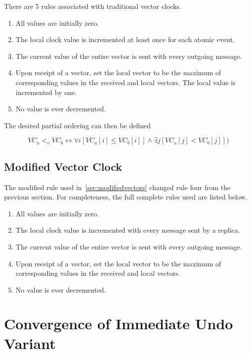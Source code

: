 \documentclass[12pt,a4paper,twoside,openright]{report}
\begin{document}
There are 5 rules associated with traditional vector clocks.
\begin{enumerate}
	\item All values are initially zero.
	\item The local clock value is incremented at least once for each atomic event.
	\item The current value of the entire vector is sent with every outgoing message.
	\item Upon receipt of a vector, set the local vector to be the maximum of corresponding values in the received and local vectors. The local value is incremented by one.
	\item No value is ever decremented.
\end{enumerate}

The desired partial ordering can then be defined

\[VC_a <_v VC_b \leftrightarrow \forall i[VC_a[i] \leq VC_b[i]] \land \exists j[VC_a[j] < VC_b[j]])\]



\section{Modified Vector Clock}
\label{appendix:modifiedvector}

The modified rule used in~\cref{sec:modifiedvectors} changed rule four from the previous section. For completeness, the full complete rules used are listed below.

\begin{enumerate}
	\item All values are initially zero.
	\item The local clock value is incremented with every message sent by a replica.
	\item The current value of the entire vector is sent with every outgoing message.
	\item Upon receipt of a vector, set the local vector to be the maximum of corresponding values in the received and local vectors.
	\item No value is ever decremented.
\end{enumerate}




\chapter{Convergence of Immediate Undo Variant}
\end{document}
